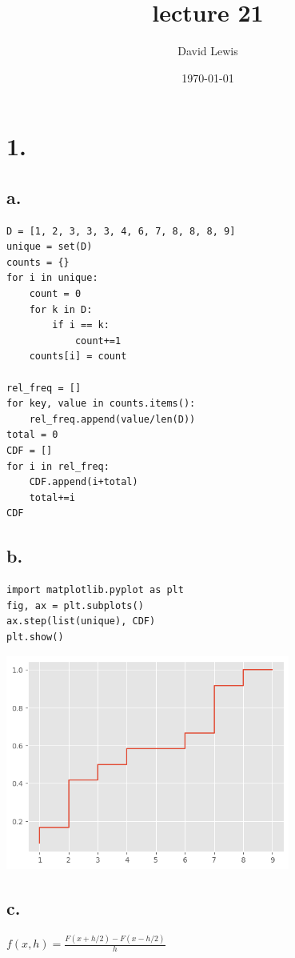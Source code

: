 \documentclass[11pt]{article}
\author{David Lewis}
\date{\today}
\title{lecture 21}
\begin{document}
\maketitle

\section*{1.}
\label{sec:org3b51ef3}
\subsection*{a.}
\label{sec:orgc5f8614}
\begin{verbatim}
D = [1, 2, 3, 3, 3, 4, 6, 7, 8, 8, 8, 9]
unique = set(D)
counts = {}
for i in unique:
    count = 0
    for k in D:
        if i == k:
            count+=1
    counts[i] = count

rel_freq = []
for key, value in counts.items():
    rel_freq.append(value/len(D))
total = 0
CDF = []
for i in rel_freq:
    CDF.append(i+total)
    total+=i
CDF
\end{verbatim}
\subsection*{b.}
\label{sec:org84179a1}
\begin{verbatim}
import matplotlib.pyplot as plt
fig, ax = plt.subplots()
ax.step(list(unique), CDF)
plt.show()
\end{verbatim}

\begin{center}
\includegraphics[width=0.7\textwidth]{test.png}
\end{center}
\subsection*{c.}
\label{sec:org11f7b70}
\(f(x,h) = \frac{F(x+h/2)- F(x-h/2)}{h}\)
\end{document}
